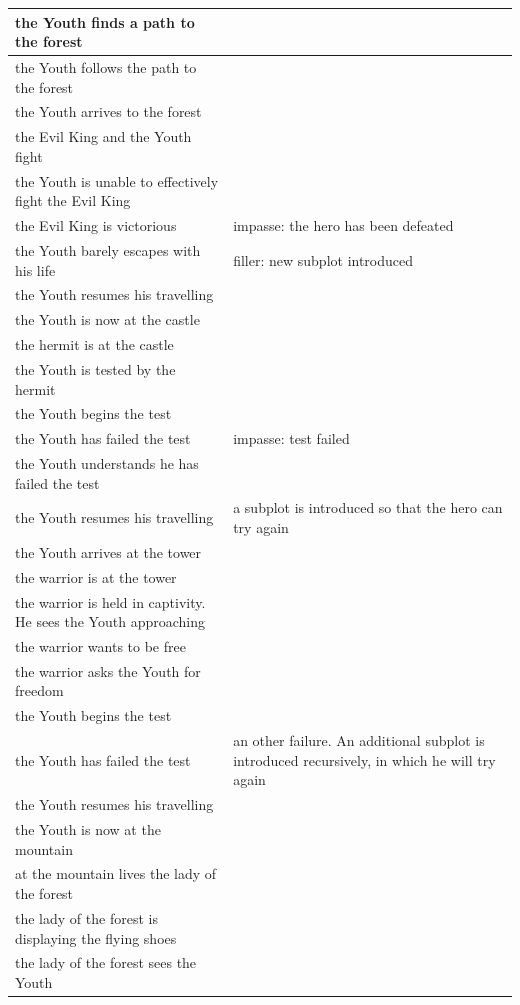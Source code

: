 \documentclass[12pt,a4paper,oneside]{report}
\begin{document}
\begin{longtable}[H]{| p{} | p{} |}
the Youth finds a path to the forest  & \\ 
\hline
the Youth follows the path to the forest  & \\ 
\hline
the Youth arrives to the forest  & \\ 
\hline
the Evil King and the Youth fight  & \\ 
\hline
the Youth is unable to effectively fight the Evil King  & \\ 
\hline
the Evil King is victorious  & impasse: the hero has been defeated\\ 
\hline
the Youth barely escapes with his life  & filler: new subplot introduced\\ 
\hline
the Youth resumes his travelling  & \\ 
\hline
the Youth is now at the castle  & \\ 
\hline
the hermit is at the castle  & \\ 
\hline
the Youth is tested by the hermit  & \\ 
\hline
the Youth begins the test  & \\ 
\hline
the Youth has failed the test  & impasse: test failed\\ 
\hline
the Youth understands he has failed the test  & \\ 
\hline
the Youth resumes his travelling  & a subplot is introduced so that the hero can try again\\ 
\hline
the Youth arrives at the tower  & \\ 
\hline
the warrior is at the tower  & \\ 
\hline
the warrior is held in captivity. He sees the Youth approaching  & \\ 
\hline
the warrior wants to be free  & \\ 
\hline
the warrior asks the Youth for freedom  & \\ 
\hline
the Youth begins the test  & \\ 
\hline
the Youth has failed the test  & an other failure. An additional subplot is introduced recursively, in which he will try again\\ 
\hline
the Youth resumes his travelling  & \\ 
\hline
the Youth is now at the mountain  & \\ 
\hline
at the mountain lives the lady of the forest  & \\ 
\hline
the lady of the forest is displaying the flying shoes  & \\ 
\hline
the lady of the forest sees the Youth  & \\ 

\end{longtable}
\end{document}
